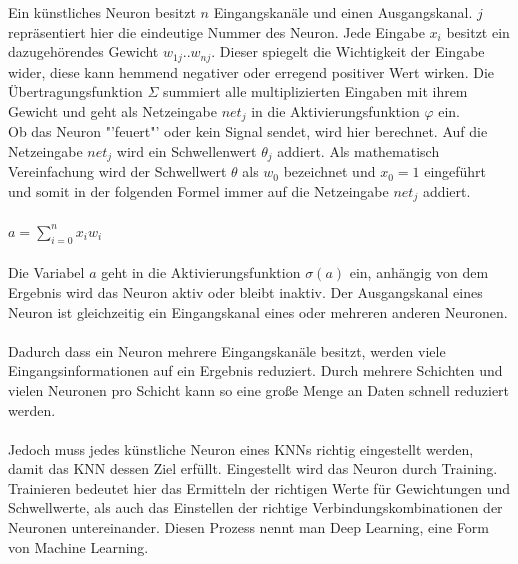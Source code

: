 \documentclass[12pt,oneside,a4paper,parskip]{scrbook}
\begin{document}
Ein künstliches Neuron besitzt $n$ Eingangskanäle und einen Ausgangskanal. $j$ repräsentiert hier die eindeutige Nummer des Neuron. Jede Eingabe $x_{i}$ besitzt ein dazugehörendes Gewicht $w_{1j}..w_{nj}$. Dieser spiegelt die Wichtigkeit der Eingabe wider, diese kann hemmend negativer oder erregend positiver Wert wirken. Die Übertragungsfunktion $\Sigma$ summiert alle multiplizierten Eingaben mit ihrem Gewicht und geht als Netzeingabe $net_j$ in die Aktivierungsfunktion $\varphi$ ein. \\
Ob das Neuron "'feuert"' oder kein Signal sendet, wird hier berechnet. Auf die Netzeingabe $net_j$ wird ein Schwellenwert $\theta_j$ addiert. Als mathematisch Vereinfachung wird der Schwellwert $\theta$ als $w_0$ bezeichnet und $x_0 = 1$ eingeführt und somit in der folgenden Formel immer auf die Netzeingabe $net_j$ addiert.
\\\\
${\displaystyle a=\sum _{i=0}^{n}x_{i}w_{i}}$
\\\\
Die Variabel $a$ geht in die Aktivierungsfunktion ${\sigma (a)}$ ein, anhängig von dem Ergebnis wird das Neuron aktiv oder bleibt inaktiv.
Der Ausgangskanal eines Neuron ist gleichzeitig ein Eingangskanal eines oder mehreren anderen Neuronen.
\\\\
Dadurch dass ein Neuron mehrere Eingangskanäle besitzt, werden viele Eingangsinformationen auf ein Ergebnis reduziert. Durch mehrere Schichten und vielen Neuronen pro Schicht kann so eine große Menge an Daten schnell reduziert werden.
\\\\
Jedoch muss jedes künstliche Neuron eines KNNs richtig eingestellt werden, damit das KNN dessen Ziel erfüllt. Eingestellt wird das Neuron durch Training. Trainieren bedeutet hier das Ermitteln der richtigen Werte für Gewichtungen und Schwellwerte, als auch das Einstellen der richtige Verbindungskombinationen der Neuronen untereinander. Diesen Prozess nennt man Deep Learning, eine Form von Machine Learning.
\end{document}
